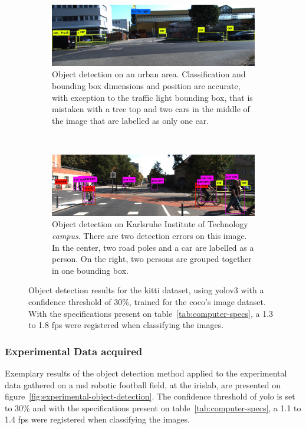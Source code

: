 \begin{figure}[ht!]
	\centering
	\begin{subfigure}[c]{0.8\textwidth}
		\includegraphics[width=\textwidth]{img/object-detection/kitti-4.jpg}
		\caption{Object detection on an urban area. Classification and bounding box dimensions and position are accurate, with exception to the traffic light bounding box, that is mistaken with a tree top and two cars in the middle of the image that are labelled as only one car.}
		\label{fig:kitti-yolo-3}
	\end{subfigure}
	\\ \vspace{4mm}
	\begin{subfigure}[c]{0.8\textwidth}
		\includegraphics[width=\textwidth]{img/object-detection/kitti-2.jpg}
		\caption{Object detection on Karlsruhe Institute of Technology \textit{campus}. There are two detection errors on this image. In the center, two road poles and a car are labelled as a person. On the right, two persons are grouped together in one bounding box.}
		\label{fig:kitti-yolo-2}
	\end{subfigure}
	\caption{Object detection results for the \ac{kitti} dataset, using \ac{yolo}v3 with a confidence threshold of 30\%, trained for the \ac{coco}'s image dataset. With the specifications present on table~\ref{tab:computer-specs}, a 1.3 to 1.8 \ac{fps} were registered when classifying the images.}
	\label{fig:kitti-object-detection}
\end{figure}


\subsubsection{Experimental Data acquired}
Exemplary results of the object detection method applied to the experimental data gathered on a \ac{msl} robotic football field, at the \acf{irislab}, are presented on figure~\ref{fig:experimental-object-detection}. The confidence threshold of \ac{yolo} is set to 30\% and with the specifications present on table~\ref{tab:computer-specs}, a 1.1 to 1.4 \ac{fps} were registered when classifying the images.

